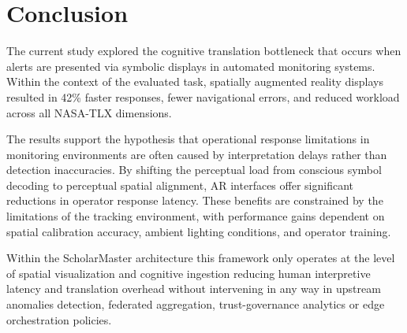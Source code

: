 \documentclass[conference]{IEEEtran}
\begin{document}
\section{Conclusion}

The current study explored the cognitive translation bottleneck that occurs when alerts are presented via symbolic displays in automated monitoring systems. Within the context of the evaluated task, spatially augmented reality displays resulted in 42\% faster responses, fewer navigational errors, and reduced workload across all NASA-TLX dimensions.

The results support the hypothesis that operational response limitations in monitoring environments are often caused by interpretation delays rather than detection inaccuracies. By shifting the perceptual load from conscious symbol decoding to perceptual spatial alignment, AR interfaces offer significant reductions in operator response latency. These benefits are constrained by the limitations of the tracking environment, with performance gains dependent on spatial calibration accuracy, ambient lighting conditions, and operator training.

Within the ScholarMaster architecture this framework only operates at the level of spatial visualization and cognitive ingestion reducing human interpretive latency and translation overhead without intervening in any way in upstream anomalies detection, federated aggregation, trust-governance analytics or edge orchestration policies.
\end{document}
